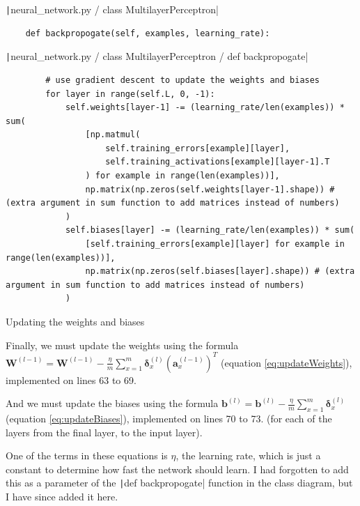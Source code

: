 \documentclass[12pt]{report}
\newcommand{\pil}[1]{\protect\texttt|#1|}
\begin{document}
\begin{listing}[H]
\pil{neural_network.py / class MultilayerPerceptron}
\begin{verbatim}
    def backpropogate(self, examples, learning_rate):
\end{verbatim}
\pil{neural_network.py / class MultilayerPerceptron / def backpropogate}
\begin{verbatim}
        # use gradient descent to update the weights and biases
        for layer in range(self.L, 0, -1):
            self.weights[layer-1] -= (learning_rate/len(examples)) * sum(
                [np.matmul(
                    self.training_errors[example][layer],
                    self.training_activations[example][layer-1].T
                ) for example in range(len(examples))],
                np.matrix(np.zeros(self.weights[layer-1].shape)) # (extra argument in sum function to add matrices instead of numbers)
            )
            self.biases[layer] -= (learning_rate/len(examples)) * sum(
                [self.training_errors[example][layer] for example in range(len(examples))],
                np.matrix(np.zeros(self.biases[layer].shape)) # (extra argument in sum function to add matrices instead of numbers)
            )
\end{verbatim}
\caption{Updating the weights and biases}\label{cs:backpropogationGradientDescent}
\end{listing}

Finally, we must update the weights using the formula $\mathbf{W}^{\left(l-1\right)}=\mathbf{W}^{\left(l-1\right)}-\frac{\eta}{m}\displaystyle\sum_{x=1}^{m}\bm{\delta}^{\left(l\right)}_x{\left(\mathbf{a}^{\left(l-1\right)}_x\right)}^T$ (equation \ref{eq:updateWeights}), implemented on lines 63 to 69.

And we must update the biases using the formula $\mathbf{b}^{\left(l\right)}=\mathbf{b}^{\left(l\right)}-\frac{\eta}{m}\displaystyle\sum_{x=1}^{m}\bm{\delta}^{\left(l\right)}_x$ (equation \ref{eq:updateBiases}), implemented on lines 70 to 73. (for each of the layers from the final layer, to the input layer).

One of the terms in these equations is $\eta$, the learning rate, which is just a constant to determine how fast the network should learn. I had forgotten to add this as a parameter of the \pil{def backpropogate} function in the class diagram, but I have since added it here.
\end{document}

